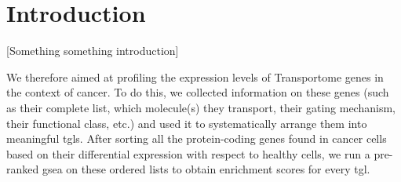 \section{Introduction}

[Something something introduction]

We therefore aimed at profiling the expression levels of Transportome genes in
the context of cancer. To do this, we collected information on these genes (such
as their complete list, which molecule(s) they transport, their gating mechanism,
their functional class, etc.) and used it to systematically arrange them into
meaningful \glspl{tgl}. After sorting all the protein-coding genes found in
cancer cells based on their differential expression with respect to healthy
cells, we run a pre-ranked \gls{gsea} on these ordered lists to obtain
enrichment scores for every \gls{tgl}.